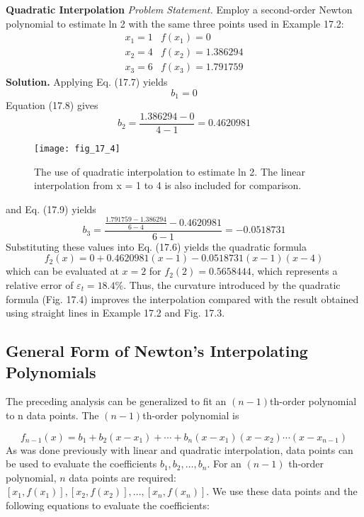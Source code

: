 \documentclass[../main.tex]{subfiles}
\begin{document}
\begin{exmp} \textbf{Quadratic Interpolation}
    \noindent\textit{Problem Statement.} Employ a second-order Newton polynomial to estimate ln 2 with
    the same three points used in Example 17.2:
    $$
\begin{array}{ll}
x_{1}=1 & f\left(x_{1}\right)=0 \\
x_{2}=4 & f\left(x_{2}\right)=1.386294 \\
x_{3}=6 & f\left(x_{3}\right)=1.791759
\end{array}
$$
    \noindent \textbf{Solution.} Applying Eq. (17.7) yields
    $$
    b_{1}=0
    $$
    Equation (17.8) gives
    $$
    b_{2}=\frac{1.386294-0}{4-1}=0.4620981
    $$

    \begin{figure}[H]
        \centering
        \texttt{[image: fig\_17\_4]}
       \caption{\textsf{The use of quadratic interpolation to estimate ln 2. The linear interpolation from x = 1 to 4 is
       also included for comparison.}}\label{fig:fig_17_4}
    \end{figure}
    and Eq. (17.9) yields
    $$
    b_{3}=\frac{\frac{1.791759-1.386294}{6-4}-0.4620981}{6-1}=-0.0518731
    $$
    Substituting these values into Eq. (17.6) yields the quadratic formula
    $$
    f_{2}(x)=0+0.4620981(x-1)-0.0518731(x-1)(x-4)
    $$
    which can be evaluated at $x=2$ for $f_{2}(2)=0.5658444$, which represents a relative error of $\varepsilon_{t}=18.4 \%$. Thus, the curvature introduced by the quadratic formula (Fig. 17.4) improves the interpolation compared with the result obtained using straight lines in Example 17.2 and Fig. 17.3.


\end{exmp}

\subsection{General Form of Newton's Interpolating Polynomials}
The preceding analysis can be generalized to fit an $(n - 1)$th-order polynomial to n data
points. The $(n - 1)$th-order polynomial is

\begin{equation}
    \tag{17.10}
f_{n-1}(x)=b_{1}+b_{2}\left(x-x_{1}\right)+\cdots+b_{n}\left(x-x_{1}\right)\left(x-x_{2}\right) \cdots\left(x-x_{n-1}\right)
\end{equation}
As was done previously with linear and quadratic interpolation, data points can be used to evaluate the coefficients $b_{1}, b_{2}, \ldots, b_{n}$. For an $(n-1)$ th-order polynomial, $n$ data points are required: $\left[x_{1}, f\left(x_{1}\right)\right],\left[x_{2}, f\left(x_{2}\right)\right], \ldots,\left[x_{n}, f\left(x_{n}\right)\right]$. We use these data points and the following equations to evaluate the coefficients:
\end{document}

